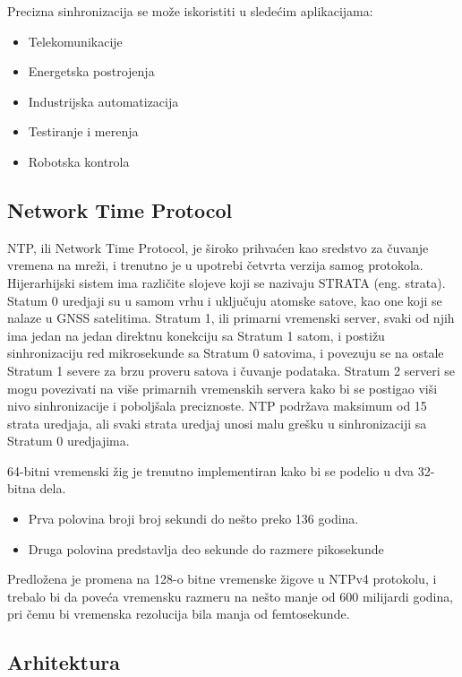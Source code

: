 \documentclass[a4paper,12pt, master]{etf}
\begin{document}
	Precizna sinhronizacija se mo\v{z}e iskoristiti u slede\'{c}im aplikacijama:
	\begin{itemize}
		\item Telekomunikacije
		\item Energetska postrojenja
		\item Industrijska automatizacija
		\item Testiranje i merenja
		\item Robotska kontrola
	\end{itemize}

	\subsection{Network Time Protocol}

	NTP, ili Network Time Protocol, je \v{s}iroko prihva\'{c}en kao sredstvo za
	\v{c}uvanje vremena na mre\v{z}i, i trenutno je u upotrebi \v{c}etvrta
	verzija samog protokola. Hijerarhijski sistem ima razli\v{c}ite slojeve
	koji se nazivaju STRATA (eng\@. strata). Statum 0 uredjaji su u samom vrhu i
	uklju\v{c}uju atomske satove, kao one koji se nalaze u GNSS satelitima.
	Stratum 1, ili primarni vremenski server, svaki od njih ima jedan na jedan
	direktnu konekciju sa Stratum 1 satom, i posti\v{z}u sinhronizaciju red
	mikrosekunde sa Stratum 0 satovima, i povezuju se na ostale Stratum 1
	severe za brzu proveru satova i \v{c}uvanje podataka. Stratum 2 serveri se
	mogu povezivati na vi\v{s}e primarnih vremenskih servera kako bi se
	postigao vi\v{s}i nivo sinhronizacije i pobolj\v{s}ala preciznoste. NTP
    podr\v{z}ava maksimum od 15 strata uredjaja, ali svaki strata uredjaj unosi
    malu gre\v{s}ku u sinhronizaciji sa Stratum 0 uredjajima.

	64-bitni vremenski \v{z}ig je trenutno implementiran kako bi se podelio u
	dva 32-bitna dela.
	\begin{itemize}
		\item Prva polovina broji broj sekundi do ne\v{s}to preko 136 godina.
		\item Druga polovina predstavlja deo sekunde do razmere pikosekunde
	\end{itemize}

	Predlo\v{z}ena je promena na 128-o bitne vremenske \v{z}igove u NTPv4
	protokolu, i trebalo bi da pove\'{c}a vremensku razmeru na ne\v{s}to manje
	od 600 milijardi godina, pri \v{c}emu bi vremenska rezolucija bila manja od
	femtosekunde.

    \subsection{Arhitektura}
\end{document}
